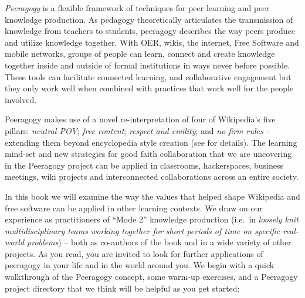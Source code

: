 
\emph{Peeragogy} is a flexible framework of techniques for peer learning and
peer knowledge production.  As pedagogy theoretically articulates the
transmission of knowledge from teachers to students, peeragogy
describes the way peers produce and utilize knowledge together.  With
OER, wikis, the internet, Free Software and mobile networks, groups of
people can learn, connect and create knowledge together inside and
outside of formal institutions in ways never before possible.  These
tools can facilitate connected learning, and collaborative engagement
but they only work well when combined with practices that work well
for the people involved.

Peeragogy makes use of a novel re-interpretation of four of
Wikipedia's five pillars: \emph{neutral POV}; \emph{free
content}; \emph{respect and civility}; and \emph{no firm rules} --
extending them beyond encyclopedia style creation
(see \pageref{good-faith-collaboration} for details).  The learning
mind-set and new strategies for good faith collaboration that we are
uncovering in the Peeragogy project can be applied in classrooms,
hackerspaces, business meetings, wiki projects and interconnected
collaborations across an entire society.

In this book we will examine the way the values that helped shape
Wikipedia and free software can be applied in other learning contexts.
We draw on our experience as practitioners of ``Mode 2'' knowledge
production (i.e.~in \emph{loosely knit multidisciplinary teams working
together for short periods of time on specific real-world problems}) --
both as co-authors of the book and in a wide variety of other
projects.
%
As you read, you are invited to look for further applications of
peeragogy in your life and in the world around you.
%
We begin with a quick walkthrough of the Peeragogy concept, some
warm-up exercises, and a Peeragogy project directory that we think
will be helpful as you get started:

\clearpage


